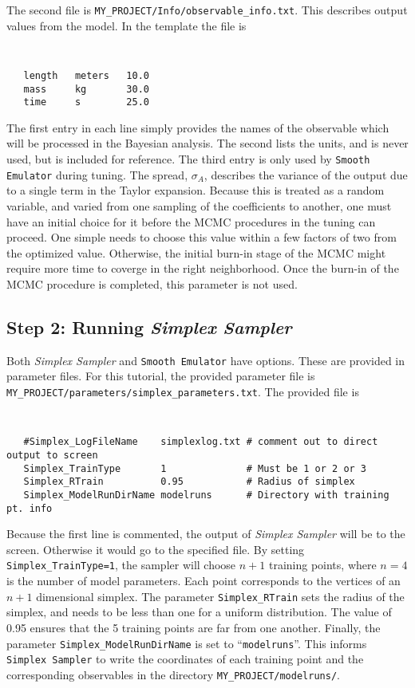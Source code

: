 \documentclass[UserManual.tex]{subfiles}
\begin{document}
The second file is {\tt MY\_PROJECT/Info/observable\_info.txt}. This describes output values from the model. In the template the file is
{\tt
\begin{verbatim}
   length   meters   10.0
   mass     kg       30.0
   time     s        25.0
\end{verbatim}
}
The first entry in each line simply provides the names of the observable which will be processed in the Bayesian analysis. The second lists the units, and is never used, but is included for reference. The third entry is only used by {\tt Smooth Emulator} during tuning. The spread, $\sigma_A$, describes the variance of the output due to a single term in the Taylor expansion. Because this is treated as a random variable, and varied from one sampling of the coefficients to another, one must have an initial choice for it before the MCMC procedures in the tuning can proceed. One simple needs to choose this value within a few factors of two from the optimized value. Otherwise, the initial burn-in stage of the MCMC might require more time to coverge in the right neighborhood. Once the burn-in of the MCMC procedure is completed, this parameter is not used. 

\subsection{Step 2: Running {\it Simplex Sampler}}

Both {\it Simplex Sampler} and {\tt Smooth Emulator} have options. These are provided in parameter files. For this tutorial, the provided parameter file is {\tt MY\_PROJECT/parameters/simplex\_parameters.txt}. The provided file is
{\tt
\begin{verbatim}
   #Simplex_LogFileName    simplexlog.txt # comment out to direct output to screen
   Simplex_TrainType       1              # Must be 1 or 2 or 3               
   Simplex_RTrain          0.95           # Radius of simplex    
   Simplex_ModelRunDirName modelruns      # Directory with training pt. info
\end{verbatim}
}
Because the first line is commented, the output of {\it Simplex Sampler} will be to the screen. Otherwise it would go to the specified file. By setting {\tt Simplex\_TrainType=1}, the sampler will choose $n+1$ training points, where $n=4$ is the number of model parameters. Each point corresponds to the vertices of an $n+1$ dimensional simplex. The parameter {\tt Simplex\_RTrain} sets the radius of the simplex, and needs to be less than one for a uniform distribution. The value of 0.95 ensures that the 5 training points are far from one another. Finally, the parameter {\tt Simplex\_ModelRunDirName} is set to ``{\tt modelruns}''. This informs {\tt Simplex Sampler} to write the coordinates of each training point and the corresponding observables in the directory {\tt MY\_PROJECT/modelruns/}. 
\end{document}
